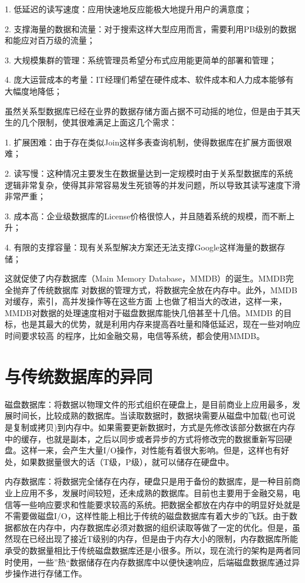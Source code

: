 \documentclass[literaturereview]{zjutreport}
\begin{document}
1. 低延迟的读写速度：应用快速地反应能极大地提升用户的满意度；

2. 支撑海量的数据和流量：对于搜索这样大型应用而言，需要利用PB级别的数据和能应对百万级的流量；

3. 大规模集群的管理：系统管理员希望分布式应用能更简单的部署和管理；

4. 庞大运营成本的考量：IT经理们希望在硬件成本、软件成本和人力成本能够有大幅度地降低；

虽然关系型数据库已经在业界的数据存储方面占据不可动摇的地位，但是由于其天生的几个限制，使其很难满足上面这几个需求：

1. 扩展困难：由于存在类似Join这样多表查询机制，使得数据库在扩展方面很艰难；

2. 读写慢：这种情况主要发生在数据量达到一定规模时由于关系型数据库的系统逻辑非常复杂，使得其非常容易发生死锁等的并发问题，所以导致其读写速度下滑非常严重；

3. 成本高：企业级数据库的License价格很惊人，并且随着系统的规模，而不断上升；

4. 有限的支撑容量：现有关系型解决方案还无法支撑Google这样海量的数据存储；

这就促使了内存数据库（Main Memory Database，MMDB）的诞生。MMDB完全抛弃了传统数据库
对数据的管理方式，将数据完全放在内存中。此外，MMDB对缓存，索引，高并发操作等在这些方面
上也做了相当大的改进，这样一来，MMDB对数据的处理速度相对于磁盘数据库能快几倍甚至十几倍。MMDB
的目标，也是其最大的优势，就是利用内存来提高吞吐量和降低延迟，现在一些对响应时间要求较高
的程序，比如金融交易，电信等系统，都会使用MMDB。

\chapter{与传统数据库的异同}
磁盘数据库：将数据以物理文件的形式组织在硬盘上，是目前商业上应用最多，发展时间长，比较成熟的数据库。当读取数据时，数据块需要从磁盘中加载(也可说是复制或拷贝)到内存中。如果需要更新数据时，方式是先修改该部分数据在内存中的缓存，也就是副本，之后以同步或者异步的方式将修改完的数据重新写回硬盘。这样一来，会产生大量I/O操作，对性能有着很大影响。但是，这样也有好处，如果数据量很大的话（T级，P级），就可以储存在硬盘中。

内存数据库：将数据完全储存在内存，硬盘只是用于备份的数据库，是一种目前商业上应用不多，发展时间较短，还未成熟的数据库。目前也主要用于金融交易，电信等一些响应要求和性能要求较高的系统。把数据全都放在内存中的明显好处就是不需要做磁盘I/O，这样性能上相比于传统的磁盘数据库有着大步的飞跃。由于数据都放在内存中，内存数据库必须对数据的组织读取等做了一定的优化。但是，虽然现在已经出现了接近T级别的内存，但是由于内存大小的限制，内存数据库所能承受的数据量相比于传统磁盘数据库还是小很多。所以，现在流行的架构是两者同时使用，一些”热“数据储存在内存数据库中以便快速响应，后端磁盘数据库通过异步操作进行存储工作。
\end{document}
